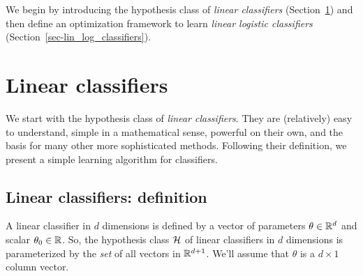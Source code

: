 We begin by introducing
the hypothesis class of {\em linear classifiers}
(Section~\ref{sec-linear_classifiers}) and then define
an optimization framework to learn {\em linear logistic
    classifiers} (Section~\ref{sec-lin_log_classifiers}).


\section{Linear classifiers}

\label{sec-linear_classifiers}

We start with the hypothesis class of {\em linear classifiers}.  They
are (relatively) easy to understand, simple in a mathematical sense,
powerful on their own, and the basis for many other more sophisticated
methods.  Following their definition, we present a simple
learning algorithm for classifiers.

\subsection{Linear classifiers: definition}

A linear classifier in $d$ dimensions is
defined by a vector of parameters $\theta \in \mathbb{R}^d$ and scalar
$\theta_0 \in \mathbb{R}$.  So, the hypothesis class ${\cal H}$ of linear
classifiers in $d$ dimensions is parameterized by the {\em set} of all vectors in
$\mathbb{R}^{d+1}$.   We'll assume that $\theta$ is a $d \times 1$ column
vector.


